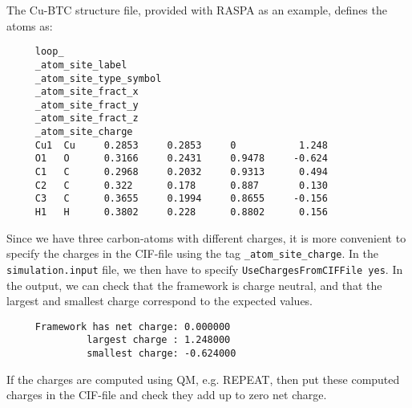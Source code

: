 The Cu-BTC structure file, provided with RASPA as an example, defines the atoms as:
\begin{tiny}
\begin{verbatim}
     loop_
     _atom_site_label
     _atom_site_type_symbol
     _atom_site_fract_x
     _atom_site_fract_y
     _atom_site_fract_z
     _atom_site_charge
     Cu1  Cu     0.2853     0.2853     0           1.248
     O1   O      0.3166     0.2431     0.9478     -0.624
     C1   C      0.2968     0.2032     0.9313      0.494
     C2   C      0.322      0.178      0.887       0.130
     C3   C      0.3655     0.1994     0.8655     -0.156
     H1   H      0.3802     0.228      0.8802      0.156
\end{verbatim}
\end{tiny}
Since we have three carbon-atoms with different charges, it is more convenient to specify the charges in the CIF-file using the tag \verb+_atom_site_charge+.
In the \verb+simulation.input+ file, we then have to specify \verb+UseChargesFromCIFFile yes+.
In the output, we can check that the framework is charge neutral, and that the largest and smallest charge correspond to the expected values.
\begin{tiny}
\begin{verbatim}
     Framework has net charge: 0.000000
              largest charge : 1.248000
              smallest charge: -0.624000
\end{verbatim}
\end{tiny}
If the charges are computed using QM, e.g. REPEAT, then put these computed charges in the CIF-file and check they add up to zero net charge.

